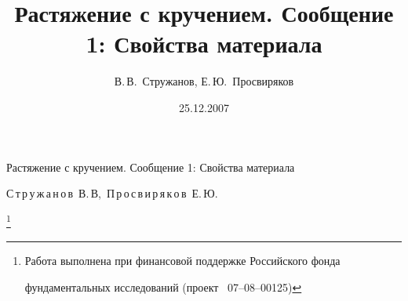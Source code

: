 %





%



\renewcommand{\firstpage}{36} %

\renewcommand{\lastpage}{44} %











\title{Растяжение с кручением. Сообщение 1: Свойства материала}

      {Растяжение с кручением. Сообщение 1: Свойства материала}


\author{В.\,В.~Стружанов, Е.\,Ю.~Просвиряков}

       {С\,т\,р\,у\,ж\,а\,н\,о\,в~В.\,В,\ П\,р\,о\,с\,в\,и\,р\,я\,к\,о\,в~Е.\,Ю. }






\date{25.12.2007}



\thanks{Работа выполнена при финансовой поддержке Российского фонда

        фундаментальных исследований (проект \No~07--08--00125)}



\address{Институт машиноведения УрО РАН;\\ Уральский государственный университет, г.\,Екатеринбург}















